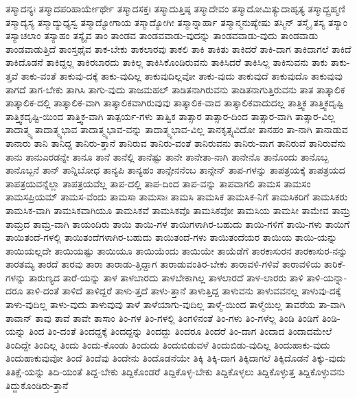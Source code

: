 {ತಸ್ಮಾದನ್ಯಃ
ತಸ್ಮಾದಪರಿಹಾರ್ಯೇರ್ಥೇ
ತಸ್ಮಾದಸಕ್ತಃ
ತಸ್ಮಾದುತ್ತಿಷ್ಠ
ತಸ್ಮಾದೇವಂ
ತಸ್ಮಾದೋಮಿತ್ಯುದಾಹೃತ್ಯ
ತಸ್ಮಾದ್ಬ್ರಹ್ಮಣಿ
ತಸ್ಮಾದ್ಯಸ್ಯ
ತಸ್ಮಾದ್ಯುಧ್ಯಸ್ವ
ತಸ್ಮಾದ್ಯೋಗಾಯ
ತಸ್ಮಾದ್ಯೋಗೀ
ತಸ್ಮಾನ್ನಾರ್ಹಾ
ತಸ್ಮಾನ್ಮನುಷ್ಯೇಷು
ತಸ್ಮಿನ್
ತಸ್ಮೈ
ತಸ್ಯ
ತಸ್ಯಾಂ
ತಸ್ಯಾಚಲಾಂ
ತಸ್ಯಾಹಂ
ತಸ್ಯೈವ
ತಾಂ
ತಾಂಡವ
ತಾಂಡವವಾಡು-ವುದನ್ನು
ತಾಂಡವವಾಡು-ವುದು
ತಾಂಡವಾಡು
ತಾಂಡವಾಡುತ್ತಿದೆ
ತಾಂಸ್ತಥೈವ
ತಾಕ-ಬೇಕು
ತಾಕಲಾರವು
ತಾಕಲಿ
ತಾಕಿ
ತಾಕಿತು
ತಾಕಿದರೆ
ತಾಕಿ-ದಾಗ
ತಾಕಿದಾಗಲೆ
ತಾಕಿದೆ
ತಾಕಿದೊಡನೆ
ತಾಕಿದ್ದಲ್ಲ
ತಾಕಿರಬಾರದು
ತಾಕಿಲ್ಲ
ತಾಕಿಸಿಕೊಂಡಿರುವನು
ತಾಕಿಸಿದರೆ
ತಾಕಿಸಿಲ್ಲ
ತಾಕಿಸುವನು
ತಾಕು
ತಾಕು-ತ್ತವೆ
ತಾಕು-ವಂತೆ
ತಾಕುವು-ದಕ್ಕೆ
ತಾಕು-ವುದಿಲ್ಲ
ತಾಕುವುದಿಲ್ಲವೋ
ತಾಕು-ವುದು
ತಾಕುವುದೆ
ತಾಕುವುದೊ
ತಾಕುವುವು
ತಾಗದೆ
ತಾಗ-ಬೇಕು
ತಾಗಿಸಿ
ತಾಗು-ವುದು
ತಾಜಮಹಲ್
ತಾಡಿತನಾಗಿರುವನು
ತಾಡಿತನಾಗುತ್ತಿರುವನು
ತಾತ
ತಾತ್ಕಾಲಿಕ
ತಾತ್ಕಾಲಿಕ-ದಲ್ಲಿ
ತಾತ್ಕಾಲಿಕ-ವಾಗಿ
ತಾತ್ಕಾಲಿಕವಾಗಿರುವುವು
ತಾತ್ಕಾಲಿಕ-ವಾದ
ತಾತ್ಕಾಲಿಕವಾದುದಲ್ಲ
ತಾತ್ತ್ವಿಕ
ತಾತ್ತ್ವಿಕದೃಷ್ಟಿ
ತಾತ್ತ್ವಿಕದೃಷ್ಟಿ-ಯಿಂದ
ತಾತ್ತ್ವಿಕ-ವಾಗಿ
ತಾತ್ಪರ್ಯ-ಗಳು
ತಾತ್ವಿಕ
ತಾತ್ಸಾರ
ತಾತ್ಸಾರ-ದಿಂದ
ತಾತ್ಸಾರ-ವಾಗಿ
ತಾತ್ಸಾರ-ವಿಲ್ಲ
ತಾದಾತ್ಮ್ಯ
ತಾದಾತ್ಮ್ಯಭಾವ
ತಾದಾತ್ಮ್ಯಭಾವ-ವನ್ನು
ತಾದಾತ್ಮ್ಯಭಾವ-ವಿಲ್ಲ
ತಾನಕೃತ್ಸ್ನವಿದೋ
ತಾನಹಂ
ತಾ-ನಾಗಿ
ತಾನಾಡುವ
ತಾನಾರು
ತಾನಿ
ತಾನಿದ್ದ
ತಾನಿರು-ತ್ತಾನೆ
ತಾನಿರುವ
ತಾನಿರು-ವಂತೆ
ತಾನಿರುವನು
ತಾನಿರು-ವಾಗ
ತಾನಿರುವೆ
ತಾನಿರುವೆನು
ತಾನು
ತಾನುಎರಡನ್ನೇ
ತಾನೂ
ತಾನೆ
ತಾನೆಲ್ಲಿ
ತಾನೆಷ್ಟು
ತಾನೇ
ತಾನೇತಾ-ನಾಗಿ
ತಾನೇನೊ
ತಾನೊಂದು
ತಾನೊಬ್ಬ
ತಾನೊಬ್ಬನೆ
ತಾನ್
ತಾನ್ನಿಬೋಧ
ತಾನ್ಯಪಿ
ತಾನ್ಯಹಂ
ತಾನ್ಸೇನನೆಂಬ
ತಾನ್ಸೇನ್
ತಾಪ-ಗಳನ್ನು
ತಾಪತ್ರಯಕ್ಕೆ
ತಾಪತ್ರಯದ
ತಾಪತ್ರಯವನ್ನೆಲ್ಲಾ
ತಾಪತ್ರಯವೆಲ್ಲ
ತಾಪ-ದಲ್ಲಿ
ತಾಪ-ದಿಂದ
ತಾಪ-ವನ್ನು
ತಾಪವಾಗಲಿ
ತಾಮಸ
ತಾಮಸಂ
ತಾಮಸಪ್ರಿಯಮ್
ತಾಮಸ-ವೆಂದು
ತಾಮಸಾ
ತಾಮಸಾಃ
ತಾಮಸಿ
ತಾಮಸಿಕ
ತಾಮಸಿಕ-ನಿಗೆ
ತಾಮಸಿಕರಿಗೆ
ತಾಮಸಿಕರು
ತಾಮಸಿಕ-ವಾಗಿ
ತಾಮಸಿಕವಾಗಿಯೂ
ತಾಮಸಿಕವೆ
ತಾಮಸಿಕವೊ
ತಾಮಸಿಕವೋ
ತಾಮಸಿಯ
ತಾಮಸೀ
ತಾಮೇವ
ತಾಮ್ರ
ತಾಮ್ರದ
ತಾಮ್ರ-ವಾಗಿ
ತಾಯಂದಿರು
ತಾಯಿ
ತಾಯಿ-ಗಳ
ತಾಯಿಗಳಾಗಿರ-ಬಹುದು
ತಾಯಿ-ಗಳಿಗೆ
ತಾಯಿ-ಗಳು
ತಾಯಿಗೆ
ತಾಯಿತಂದೆ-ಗಳಲ್ಲಿ
ತಾಯಿತಂದೆಗಳಾಗಿರ-ಬಹುದು
ತಾಯಿತಂದೆ-ಗಳು
ತಾಯಿತಂದೆಯರ
ತಾಯಿಯ
ತಾಯಿ-ಯನ್ನು
ತಾಯಿಯಲ್ಲದೇ
ತಾಯಿಯಷ್ಟು
ತಾಯಿಯೂ
ತಾಯಿಯೆಂದು
ತಾಯಿಯೇ
ತಾಯೆಡೆಗೆ
ತಾರಕಾಸುರನ
ತಾರಕಾಸುರ-ನನ್ನು
ತಾರತಮ್ಯ
ತಾರದೆ
ತಾರವು
ತಾರಾ
ತಾರಾಡು-ತ್ತಿದ್ದಾಗ
ತಾರಾಡುವಂತಿರ-ಬೇಕು
ತಾರಾವಳಿ-ಗಳಿವೆ
ತಾರಾವಳಿಯ
ತಾರಿಕೆ-ಗಳನ್ನು
ತಾರುಣ್ಯದ
ತಾರೆ-ಯನ್ನು
ತಾಳ
ತಾಳಬಾರದು
ತಾಳಬೇಕಾಗಿಲ್ಲ
ತಾಳಲಾರದೆ
ತಾಳ-ಲಾರರು
ತಾಳಿ
ತಾಳಿ-ಯನ್ನಾ-ದರೂ
ತಾಳಿ-ದಂತೆ
ತಾಳಿದೆ
ತಾಳಿದ್ದರೆ
ತಾಳು-ತ್ತದೆ
ತಾಳು-ತ್ತಾನೆ
ತಾಳುತ್ತಿದ್ದ
ತಾಳುವನು
ತಾಳುವವನಲ್ಲ
ತಾಳುವು-ದಕ್ಕೆ
ತಾಳು-ವುದಿಲ್ಲ
ತಾಳು-ವುದು
ತಾಳುವುವು
ತಾಳೆ
ತಾಳೆಯಾಗು-ವುದಿಲ್ಲ
ತಾಳ್ಮೆ-ಯಿಂದ
ತಾಳ್ಮೆಯಿಲ್ಲ
ತಾವರೆಯ
ತಾ-ವಾಗಿ
ತಾವಾನ್
ತಾವು
ತಾವೆ
ತಾವೇ
ತಾಸಾಂ
ತಿಂ-ಗಳ
ತಿಂ-ಗಳಲ್ಲಿ
ತಿಂಗಳಿನಂತೆ
ತಿಂ-ಗಳು
ತಿಂ-ಗಳೆಲ್ಲ
ತಿಂಡಿ
ತಿಂಡಿಗೆ
ತಿಂಡಿ-ಯನ್ನು
ತಿಂದ
ತಿಂ-ದಂತೆ
ತಿಂದದ್ದಕ್ಕೆ
ತಿಂದದ್ದನ್ನು
ತಿಂದದ್ದು
ತಿಂದರೂ
ತಿಂದರೆ
ತಿಂ-ದಾಗ
ತಿಂದಾದ
ತಿಂದಾದಮೇಲೆ
ತಿಂದಿದ್ದೇ
ತಿಂದಿಲ್ಲ
ತಿಂದು
ತಿಂದು-ಕೊಂಡು
ತಿಂದುದು
ತಿಂದುಬಿಡುವಳೆ
ತಿಂದುಬಿಡು-ವುದಿಲ್ಲ
ತಿಂದುಹಾಕು-ವುದು
ತಿಂದುಹಾಕುವುವೋ
ತಿಂದೆ
ತಿಂದೆವು
ತಿಂದೇನು
ತಿಂದೊಡನೆಯೇ
ತಿಕ್ಕಿ
ತಿಕ್ಕಿ-ದಾಗ
ತಿಕ್ಕಿದಾಗಲೆ
ತಿಕ್ಕಿದೊಡನೆ
ತಿಕ್ಕು-ವುದು
ತಿತಿಕ್ಷೆ-ಯನ್ನು
ತಿದಿ-ಯಂತೆ
ತಿದ್ದ-ಬೇಕು
ತಿದ್ದಿಕೊಂಡರೆ
ತಿದ್ದಿಕೊಳ್ಳ-ಬೇಕು
ತಿದ್ದಿಕೊಳ್ಳಲು
ತಿದ್ದಿಕೊಳ್ಳುತ್ತ
ತಿದ್ದಿಕೊಳ್ಳುವನು
ತಿದ್ದುಕೊಂಡಿರು-ತ್ತಾನೆ
}
